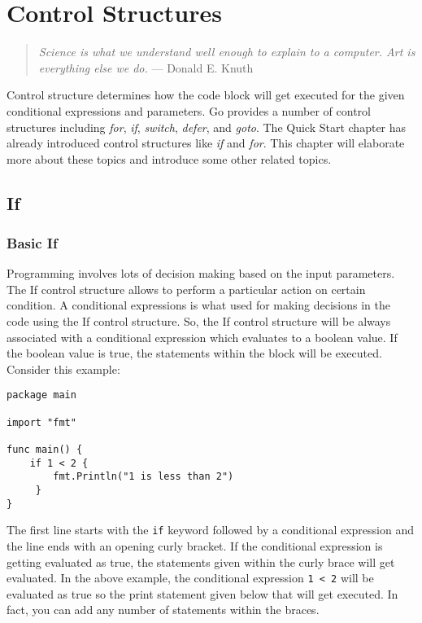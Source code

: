\cleardoublepage
{}
\chapter{Control Structures}

\begin{quote}
\textit{Science is what we understand well enough to explain to a
computer. Art is everything else we do.} --- Donald E. Knuth
\end{quote}

Control structure determines how the code block will get executed for the given
conditional expressions and parameters. Go provides a number of control
structures including \textit{for}, \textit{if}, \textit{switch}, \textit{defer},
and \textit{goto}. The Quick Start chapter has already introduced control
structures like \textit{if} and \textit{for}. This chapter will elaborate more
about these topics and introduce some other related topics.

\section{If}

\subsection{Basic If}

Programming involves lots of decision making based on the input
parameters.  The If control structure allows to perform a
particular action on certain condition.  A conditional expressions is
what used for making decisions in the code using the If control
structure.  So, the If control structure will be always associated
with a conditional expression which evaluates to a boolean value.  If
the boolean value is true, the statements within the block will be
executed.  Consider this example:

\begin{lstlisting}[caption=If example program]
package main

import "fmt"

func main() {
    if 1 < 2 {
        fmt.Println("1 is less than 2")
     }
}
\end{lstlisting}

The first line starts with the \texttt{if} keyword followed by a
conditional expression and the line ends with an opening curly
bracket.  If the conditional expression is getting evaluated as true,
the statements given within the curly brace will get evaluated.  In
the above example, the conditional expression \texttt{1 < 2} will be
evaluated as true so the print statement given below that will get
executed.  In fact, you can add any number of statements within the
braces.

